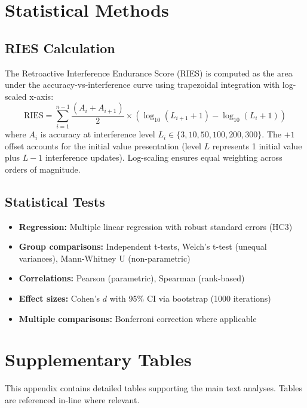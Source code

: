 \documentclass{article}
\begin{document}
\section{Statistical Methods}
\label{appendix:stats}

\subsection{RIES Calculation}
The Retroactive Interference Endurance Score (RIES) is computed as the area under the accuracy-vs-interference curve using trapezoidal integration with log-scaled x-axis:
\vspace{-2pt}
\begin{equation}
\text{RIES} = \sum_{i=1}^{n-1} \frac{(A_i + A_{i+1})}{2} \times (\log_{10}(L_{i+1} + 1) - \log_{10}(L_i + 1))
\end{equation}
\vspace{-2pt}
\noindent where $A_i$ is accuracy at interference level $L_i \in \{3, 10, 50, 100, 200, 300\}$. The $+1$ offset accounts for the initial value presentation (level $L$ represents 1 initial value plus $L-1$ interference updates). Log-scaling ensures equal weighting across orders of magnitude.

\subsection{Statistical Tests}
\begin{itemize}[itemsep=2pt,topsep=3pt,parsep=0pt]
    \item \textbf{Regression:} Multiple linear regression with robust standard errors (HC3)
    \item \textbf{Group comparisons:} Independent t-tests, Welch's t-test (unequal variances), Mann-Whitney U (non-parametric)
    \item \textbf{Correlations:} Pearson (parametric), Spearman (rank-based)
    \item \textbf{Effect sizes:} Cohen's $d$ with 95\% CI via bootstrap (1000 iterations)
    \item \textbf{Multiple comparisons:} Bonferroni correction where applicable
\end{itemize}

\section{Supplementary Tables}
\label{appendix:tables}

This appendix contains detailed tables supporting the main text analyses. Tables are referenced in-line where relevant.
\end{document}
